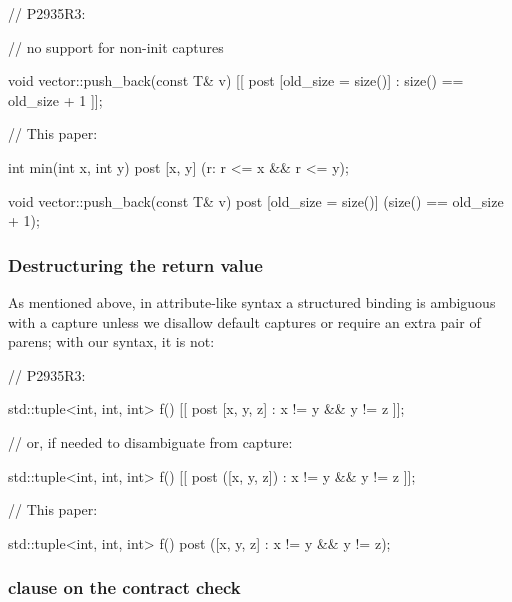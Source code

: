 \begin{minipage}[t]{8cm}
\begin{codeblock}
// P2935R3:

// no support for non-init captures


void vector::push_back(const T& v)
  [[ post [old_size = size()]
    : size() == old_size + 1 ]];
    
\end{codeblock}
\end{minipage}
\begin{minipage}[t]{8cm}
\begin{codeblock}
// This paper:
    
int min(int x, int y)
  post [x, y] (r: r <= x && r <= y);
  
void vector::push_back(const T& v)
  post [old_size = size()] 
    (size() == old_size + 1);
\end{codeblock}
\end{minipage}


\subsubsection{Destructuring the return value}
\label{subsubsec:struct}

As mentioned above, in attribute-like syntax a structured binding is ambiguous with a capture unless we disallow default captures or require an extra pair of parens; with our syntax, it is not:

\begin{minipage}[t]{8cm}
\begin{codeblock}
// P2935R3:

std::tuple<int, int, int> f()
  [[ post [x, y, z] : x != y && y != z ]];
  
// or, if needed to disambiguate from capture:

std::tuple<int, int, int> f()
  [[ post ([x, y, z]) : x != y && y != z ]];
\end{codeblock}
\end{minipage}
\begin{minipage}[t]{8cm}
\begin{codeblock}
// This paper:

std::tuple<int, int, int> f()
  post ([x, y, z] : x != y && y != z);
\end{codeblock}
\end{minipage}

\subsubsection{ clause on the contract check}

